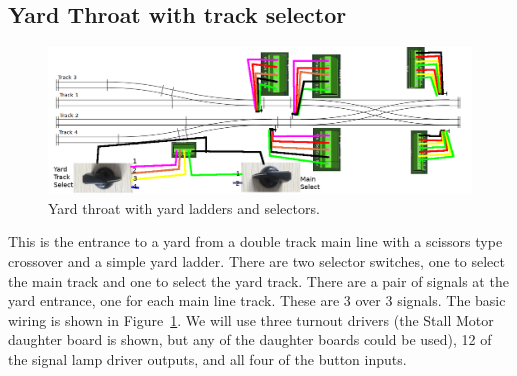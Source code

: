 %
%
%
%
% 
%
%
%
%
%
% 
%

\subsection{Yard Throat with track selector}
\label{sect-appl:yardthroat}

\begin{figure}[hbpt]\begin{centering}%
\includegraphics[width=5in]{YardThroat_TrackSelector.png}
\caption{Yard throat with yard ladders and selectors.}
\label{fig:YardThroatTrackSelector}
\end{centering}\end{figure}

This is the entrance to a yard from a double track main line with a scissors 
type crossover and a simple yard ladder.  There are two selector switches, one 
to select the main track and one to select the yard track.  There are a pair 
of signals at the yard entrance, one for each main line track.  These are 3 
over 3 signals.  The basic wiring is shown in 
Figure~\ref{fig:YardThroatTrackSelector}. We will use three turnout drivers 
(the Stall Motor daughter board is shown, but any of the daughter 
boards could be used), 12 of the signal lamp driver outputs, and all four of 
the button inputs.

